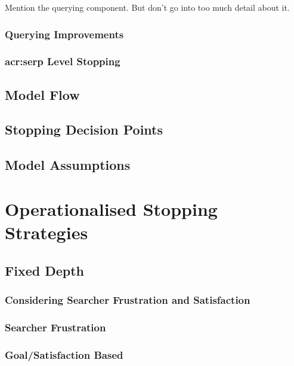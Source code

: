 Mention the querying component. But don't go into too much detail about it.

\subsubsection{Querying Improvements}

\subsubsection{\gls{acr:serp} Level Stopping}


\subsection{Model Flow}\label{sec:csm:csm:flow}

\subsection{Stopping Decision Points}\label{sec:csm:csm:stopping}

\subsection{Model Assumptions}\label{sec:csm:csm:assumptions}

\section{Operationalised Stopping Strategies}\label{sec:csm:stopping}

\subsection{Fixed Depth}

\subsubsection{Considering Searcher Frustration and Satisfaction}

\subsubsection{Searcher Frustration}

\subsubsection{Goal/Satisfaction Based}

